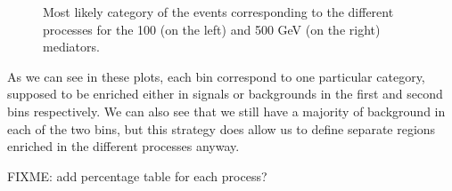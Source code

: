 \documentclass[a4paper, 10pt, openright]{report}
\begin{document}
\begin{figure}[htbp]
\caption{Most likely category of the events corresponding to the different processes for the 100 (on the left) and 500 GeV (on the right) mediators.}
\label{fig:weightsApplied}
\end{figure}

As we can see in these plots, each bin correspond to one particular category, supposed to be enriched either in signals or backgrounds in the first and second bins respectively. We can also see that we still have a majority of background in each of the two bins, but this strategy does allow us to define separate regions enriched in the different processes anyway.

\color{red}FIXME: add percentage table for each process? \color{black}
\end{document}
